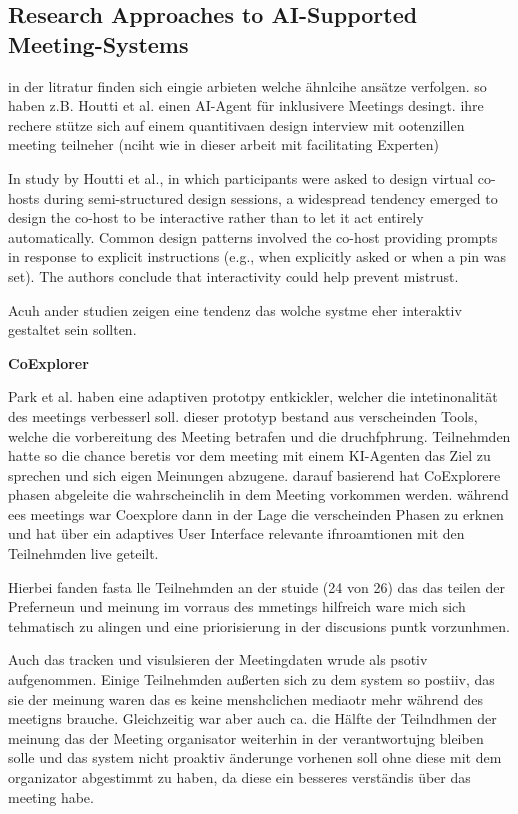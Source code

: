 \subsection{Research Approaches to AI-Supported Meeting-Systems}
\label{sec:research-approaches-to-ai-supported-meeting-systems}
in der litratur finden sich eingie arbieten welche ähnlcihe ansätze verfolgen. so haben z.B. Houtti et al.
einen AI-Agent für inklusivere Meetings desingt. ihre rechere stütze sich auf einem quantitivaen design
interview mit ootenzillen meeting teilneher (nciht wie in dieser arbeit mit facilitating Experten)

In study by Houtti et al.\cite[p. 5]{houttiObserveAskIntervene2025},
in which participants were asked to design virtual co-hosts during semi-structured design sessions,
a widespread tendency emerged to design the co-host to be interactive rather than to let it act entirely
automatically.
Common design patterns involved the co-host providing prompts in response to explicit instructions (e.g.,
when explicitly asked or when a pin was set).
The authors conclude that interactivity could help prevent mistrust.

Acuh ander studien zeigen eine tendenz das wolche systme eher interaktiv gestaltet sein sollten.

\textbf{CoExplorer}

Park et al. \cite{parkCoExplorerTechnologyProbe2024} haben eine adaptiven prototpy entkickler, welcher die
intetinonalität des meetings verbesserl soll. dieser prototyp bestand aus verscheinden Tools, welche die
vorbereitung des Meeting betrafen und die druchfphrung. Teilnehmden hatte so die chance beretis vor dem
meeting mit einem KI-Agenten das Ziel zu sprechen und sich eigen Meinungen abzugene. darauf basierend hat
CoExplorere phasen abgeleite die wahrscheinclih in dem Meeting vorkommen werden. während ees meetings war
Coexplore dann in der Lage die verscheinden Phasen zu erknen und hat über ein adaptives User Interface
relevante ifnroamtionen mit den Teilnehmden live geteilt.

Hierbei fanden fasta lle Teilnehmden an der stuide (24
von 26) das das teilen der Preferneun und meinung im vorraus des mmetings hilfreich ware mich sich tehmatisch
zu alingen und eine priorisierung in der discusions puntk vorzunhmen.

Auch das tracken und visulsieren der Meetingdaten wrude als psotiv aufgenommen.
Einige Teilnehmden außerten sich zu dem system so postiiv, das sie der meinung waren das es keine
menshclichen mediaotr mehr während des meetigns brauche.
Gleichzeitig war aber auch ca. die Hälfte der Teilndhmen der meinung das der Meeting organisator weiterhin in
der verantwortujng bleiben solle und das system nicht proaktiv änderunge vorhenen soll ohne diese mit dem
organizator abgestimmt zu haben, da diese ein besseres verständis über das meeting habe.

